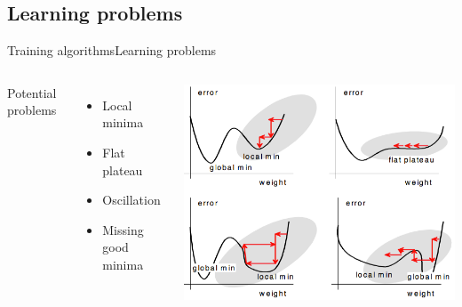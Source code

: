 \documentclass[10pt,compress]{beamer} %
\begin{document}
\subsection{Learning problems}
\begin{frame}{Training algorithms}{Learning problems}
    \begin{columns}
		Potential problems
		\begin{itemize}
		\item Local minima
		\item Flat plateau
		\item Oscillation
		\item Missing good minima
		\end{itemize}

	 \begin{center}
	\includegraphics[width=\linewidth]{figs/problems.png}
 	\end{center}
   \end{columns}
\end{frame}
\end{document}
